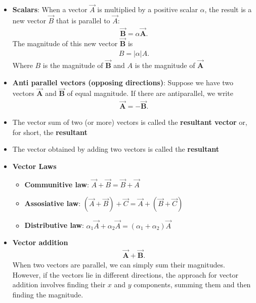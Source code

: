 \documentclass{report}
\begin{document}
\begin{itemize}
        \item \textbf{Scalars}: When a vector $\vec{A}$ is multiplied by a positive scalar $\alpha$, the result is a new vector $\vec{B}$ that is parallel to $\vec{A}$:
            \begin{align*}
                \vec{\textbf{B}} = \alpha \vec{\textbf{A}}
            .\end{align*}
            The magnitude of this new vector $\vec{\textbf{B}}$ is 
            \begin{align*}
                B = |\alpha|A
            .\end{align*}
            Where $B$ is the magnitude of $\vec{\textbf{B}} $ and $A$ is the magnitude of $\vec{\textbf{A}} $ 
        \item \textbf{Anti parallel vectors (opposing directions)}: Suppose we have two vectors $\vec{\textbf{A}}$ and $\vec{\textbf{B}}$ of equal magnitude. If there are antiparallel, we write
            \begin{align*}
                \vec{\textbf{A}} = -\vec{\textbf{B}} 
            .\end{align*}
        \item The vector sum of two (or more) vectors is called the \textbf{resultant vector} or, for short, the \textbf{resultant}
        \item The vector obtained by adding two vectors is called the \textbf{resultant}
        \item \textbf{Vector Laws }
            \begin{itemize}
                \item \textbf{Communitive law}: $\vec{A} + \vec{B} = \vec{B} + \vec{A}$
                \item \textbf{Assosiative law}: $(\vec{A} + \vec{B}) + \vec{C} = \vec{A} + (\vec{B} + \vec{C})$ 
                \item \textbf{Distributive law}: $\alpha_1 \vec{A} + \alpha_2 \vec{A} = (\alpha_1 + \alpha_2)\vec{A}$
            \end{itemize}
        \item \textbf{Vector addition}
            \begin{align*}
               \vec{\textbf{A}} + \vec{\textbf{B}} 
            .\end{align*}
            When two vectors are parallel, we can simply sum their magnitudes. However, if the vectors lie in different directions, the approach for vector addition involves finding their $x$ and $y$ components, summing them and then finding the magnitude. 

\end{itemize}
\end{document}
